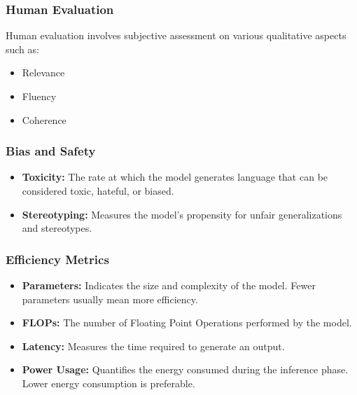 \subsubsection{Human Evaluation}

Human evaluation involves subjective assessment on various qualitative aspects such as:

\begin{itemize}
    \item Relevance
    \item Fluency
    \item Coherence
\end{itemize}

\subsubsection{Bias and Safety}

\begin{itemize}
    \item \textbf{Toxicity:} The rate at which the model generates language that can be considered toxic, hateful, or biased.
    \item \textbf{Stereotyping:} Measures the model's propensity for unfair generalizations and stereotypes.
\end{itemize}

\subsubsection{Efficiency Metrics}

\begin{itemize}
    \item \textbf{Parameters:} Indicates the size and complexity of the model. Fewer parameters usually mean more efficiency.
    \item \textbf{FLOPs:} The number of Floating Point Operations performed by the model.
    \item \textbf{Latency:} Measures the time required to generate an output.
    \item \textbf{Power Usage:} Quantifies the energy consumed during the inference phase. Lower energy consumption is preferable.
\end{itemize}
